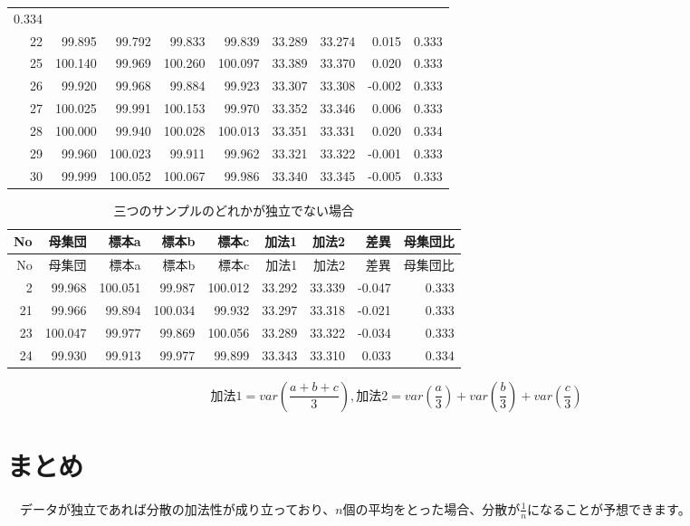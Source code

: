 \documentclass[]{tufte-handout}
\begin{document}
\begin{longtable}[]{@{}rrrrrrrrr@{}}
0.334 \\
22 & 99.895 & 99.792 & 99.833 & 99.839 & 33.289 & 33.274 & 0.015 &
0.333 \\
25 & 100.140 & 99.969 & 100.260 & 100.097 & 33.389 & 33.370 & 0.020 &
0.333 \\
26 & 99.920 & 99.968 & 99.884 & 99.923 & 33.307 & 33.308 & -0.002 &
0.333 \\
27 & 100.025 & 99.991 & 100.153 & 99.970 & 33.352 & 33.346 & 0.006 &
0.333 \\
28 & 100.000 & 99.940 & 100.028 & 100.013 & 33.351 & 33.331 & 0.020 &
0.334 \\
29 & 99.960 & 100.023 & 99.911 & 99.962 & 33.321 & 33.322 & -0.001 &
0.333 \\
30 & 99.999 & 100.052 & 100.067 & 99.986 & 33.340 & 33.345 & -0.005 &
0.333 \\
\bottomrule
\end{longtable}

\begin{longtable}[]{@{}rrrrrrrrr@{}}
\caption{三つのサンプルのどれかが独立でない場合}\tabularnewline
\toprule
No & 母集団 & 標本a & 標本b & 標本c & 加法1 & 加法2 & 差異 & 母集団比 \\
\midrule
\endfirsthead
\toprule
No & 母集団 & 標本a & 標本b & 標本c & 加法1 & 加法2 & 差異 & 母集団比 \\
\midrule
\endhead
2 & 99.968 & 100.051 & 99.987 & 100.012 & 33.292 & 33.339 & -0.047 &
0.333 \\
21 & 99.966 & 99.894 & 100.034 & 99.932 & 33.297 & 33.318 & -0.021 &
0.333 \\
23 & 100.047 & 99.977 & 99.869 & 100.056 & 33.289 & 33.322 & -0.034 &
0.333 \\
24 & 99.930 & 99.913 & 99.977 & 99.899 & 33.343 & 33.310 & 0.033 &
0.334 \\
\bottomrule
\end{longtable}

\[\mbox{加法1} = var(\frac{a + b + c}{3}),　\mbox{加法2} = var(\frac{a}{3}) + var(\frac{b}{3}) + var(\frac{c}{3})\]

\newpage

\hypertarget{ux307eux3068ux3081}{%
\section{まとめ}\label{ux307eux3068ux3081}}

　データが独立であれば分散の加法性が成り立っており、\(n\)個の平均をとった場合、分散が\(\frac{1}{n}\)になることが予想できます。
\end{document}
